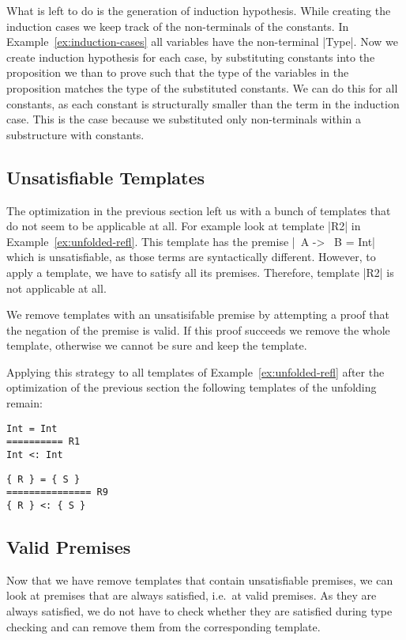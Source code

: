 What is left to do is the generation of induction hypothesis. While
creating the induction cases we keep track of the non-terminals of the
constants. In Example~\ref{ex:induction-cases} all variables have the
non-terminal \code|Type|. Now we create induction hypothesis for each
case, by substituting constants into the proposition we than to prove
such that the type of the variables in the proposition matches the
type of the substituted constants. We can do this for all constants,
as each constant is structurally smaller than the term in the
induction case. This is the case because we substituted only
non-terminals within a substructure with constants.

\subsection{Unsatisfiable Templates}
The optimization in the previous section left us with a bunch of
templates that do not seem to be applicable at all. For example look
at template \code|R2| in Example~\ref{ex:unfolded-refl}. This template
has the premise \code|~A -> ~B = Int| which is unsatisfiable, as those
terms are syntactically different. However, to apply a template, we
have to satisfy all its premises. Therefore, template \code|R2| is not
applicable at all.

We remove templates with an unsatisifable premise by attempting a
proof that the negation of the premise is valid. If this proof
succeeds we remove the whole template, otherwise we cannot be sure and
keep the template.

Applying this strategy to all templates of
Example~\ref{ex:unfolded-refl} after the optimization of the previous
section the following templates of the unfolding remain:
\begin{multicols}{2}
\begin{lstlisting}[language=sltc]
Int = Int
========== R1
Int <: Int
\end{lstlisting}
\begin{lstlisting}[language=sltc]
{ R } = { S }
=============== R9
{ R } <: { S }
\end{lstlisting}
\end{multicols}

\subsection{Valid Premises}
Now that we have remove templates that contain unsatisfiable premises,
we can look at premises that are always satisfied, i.e.\ at valid
premises. As they are always satisfied, we do not have to check
whether they are satisfied during type checking and can remove them
from the corresponding template.

